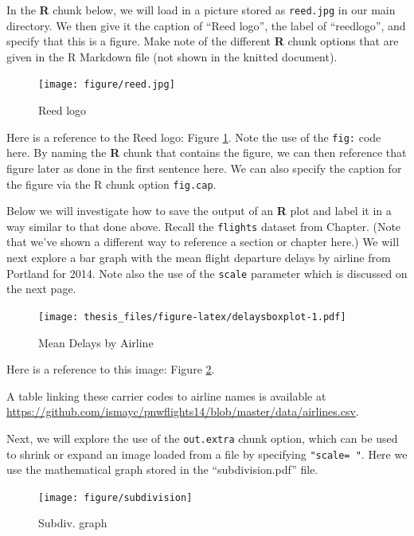 \documentclass[12pt,twoside]{reedthesis}
\theoremstyle{definition}
\theoremstyle{definition}
\theoremstyle{remark}
\begin{document}
  In the \textbf{R} chunk below, we will load in a picture stored as
  \texttt{reed.jpg} in our main directory. We then give it the caption of
  ``Reed logo'', the label of ``reedlogo'', and specify that this is a
  figure. Make note of the different \textbf{R} chunk options that are
  given in the R Markdown file (not shown in the knitted document).
  
  \begin{figure}[htbp]
  \centering
  \texttt{[image: figure/reed.jpg]}
  \caption{\label{fig:reedlogo}Reed logo}
  \end{figure}
  
  Here is a reference to the Reed logo: Figure \ref{fig:reedlogo}. Note
  the use of the \texttt{fig:} code here. By naming the \textbf{R} chunk
  that contains the figure, we can then reference that figure later as
  done in the first sentence here. We can also specify the caption for the
  figure via the R chunk option \texttt{fig.cap}.
  
  \clearpage 
  
  Below we will investigate how to save the output of an \textbf{R} plot
  and label it in a way similar to that done above. Recall the
  \texttt{flights} dataset from Chapter. (Note that we've shown a
  different way to reference a section or chapter here.) We will next
  explore a bar graph with the mean flight departure delays by airline
  from Portland for 2014. Note also the use of the \texttt{scale}
  parameter which is discussed on the next page.
  
  \begin{figure}[htbp]
  \centering
  \texttt{[image: thesis\_files/figure-latex/delaysboxplot-1.pdf]}
  \caption{\label{fig:delaysboxplot}Mean Delays by Airline}
  \end{figure}
  
  Here is a reference to this image: Figure \ref{fig:delaysboxplot}.
  
  A table linking these carrier codes to airline names is available at
  \url{https://github.com/ismayc/pnwflights14/blob/master/data/airlines.csv}.
  
  \clearpage
  
  Next, we will explore the use of the \texttt{out.extra} chunk option,
  which can be used to shrink or expand an image loaded from a file by
  specifying \texttt{"scale=\ "}. Here we use the mathematical graph
  stored in the ``subdivision.pdf'' file.
  
  \begin{figure}
  \texttt{[image: figure/subdivision]} \caption{Subdiv. graph}\label{fig:subd}
  \end{figure}
  
\end{document}
